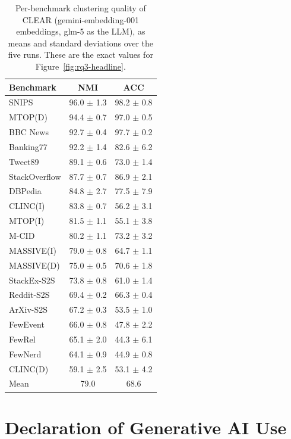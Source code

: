 \documentclass[11pt,a4paper,oneside]{report}
\begin{document}
\begin{table}[htbp]
\centering
\small
\begin{tabular}{lcc}
\toprule
Benchmark & NMI & ACC \\
\midrule
SNIPS & 96.0 $\pm$ 1.3 & 98.2 $\pm$ 0.8 \\
MTOP(D) & 94.4 $\pm$ 0.7 & 97.0 $\pm$ 0.5 \\
BBC News & 92.7 $\pm$ 0.4 & 97.7 $\pm$ 0.2 \\
Banking77 & 92.2 $\pm$ 1.4 & 82.6 $\pm$ 6.2 \\
Tweet89 & 89.1 $\pm$ 0.6 & 73.0 $\pm$ 1.4 \\
StackOverflow & 87.7 $\pm$ 0.7 & 86.9 $\pm$ 2.1 \\
DBPedia & 84.8 $\pm$ 2.7 & 77.5 $\pm$ 7.9 \\
CLINC(I) & 83.8 $\pm$ 0.7 & 56.2 $\pm$ 3.1 \\
MTOP(I) & 81.5 $\pm$ 1.1 & 55.1 $\pm$ 3.8 \\
M-CID & 80.2 $\pm$ 1.1 & 73.2 $\pm$ 3.2 \\
MASSIVE(I) & 79.0 $\pm$ 0.8 & 64.7 $\pm$ 1.1 \\
MASSIVE(D) & 75.0 $\pm$ 0.5 & 70.6 $\pm$ 1.8 \\
StackEx-S2S & 73.8 $\pm$ 0.8 & 61.0 $\pm$ 1.4 \\
Reddit-S2S & 69.4 $\pm$ 0.2 & 66.3 $\pm$ 0.4 \\
ArXiv-S2S & 67.2 $\pm$ 0.3 & 53.5 $\pm$ 1.0 \\
FewEvent & 66.0 $\pm$ 0.8 & 47.8 $\pm$ 2.2 \\
FewRel & 65.1 $\pm$ 2.0 & 44.3 $\pm$ 6.1 \\
FewNerd & 64.1 $\pm$ 0.9 & 44.9 $\pm$ 0.8 \\
CLINC(D) & 59.1 $\pm$ 2.5 & 53.1 $\pm$ 4.2 \\
\midrule
Mean & 79.0 & 68.6 \\
\bottomrule
\end{tabular}
\caption[CLEAR per-benchmark scores]{Per-benchmark clustering quality of CLEAR ({\small\ttfamily gemini-embedding-001} embeddings, {\small\ttfamily glm-5} as the LLM), as means and standard deviations over the five runs. These are the exact values for Figure~\ref{fig:rq3-headline}.}
\label{tab:rq3-headline}
\end{table}


\FloatBarrier
\clearpage
\chapter*{Declaration of Generative AI Use}
\end{document}
